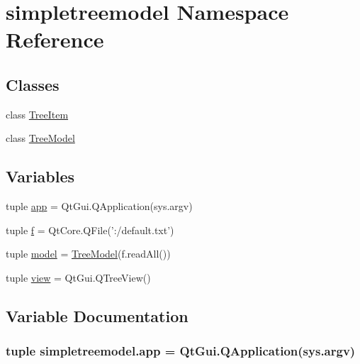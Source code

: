 \hypertarget{namespacesimpletreemodel}{}\section{simpletreemodel Namespace Reference}
\label{namespacesimpletreemodel}
\subsection*{Classes}
\begin{DoxyCompactItemize}
\item 
class \hyperlink{classsimpletreemodel_1_1TreeItem}{Tree\+Item}
\item 
class \hyperlink{classsimpletreemodel_1_1TreeModel}{Tree\+Model}
\end{DoxyCompactItemize}
\subsection*{Variables}
\begin{DoxyCompactItemize}
\item 
tuple \hyperlink{namespacesimpletreemodel_ae4942ea93e20aeb815953d919cacb52b}{app} = Qt\+Gui.\+Q\+Application(sys.\+argv)
\item 
tuple \hyperlink{namespacesimpletreemodel_a3f035ef87a5aa2abb8fbf618a27f931a}{f} = Qt\+Core.\+Q\+File('\+:/default.\+txt')
\item 
tuple \hyperlink{namespacesimpletreemodel_a7819016d83cff061893e791ada1a7537}{model} = \hyperlink{classsimpletreemodel_1_1TreeModel}{Tree\+Model}(f.\+read\+All())
\item 
tuple \hyperlink{namespacesimpletreemodel_a413eefcad78a800c8118faef88c5e481}{view} = Qt\+Gui.\+Q\+Tree\+View()
\end{DoxyCompactItemize}


\subsection{Variable Documentation}
\hypertarget{namespacesimpletreemodel_ae4942ea93e20aeb815953d919cacb52b}{}
\subsubsection[{app}]{\setlength{\rightskip}{0pt plus 5cm}tuple simpletreemodel.\+app = Qt\+Gui.\+Q\+Application(sys.\+argv)}\label{namespacesimpletreemodel_ae4942ea93e20aeb815953d919cacb52b}
\hypertarget{namespacesimpletreemodel_a3f035ef87a5aa2abb8fbf618a27f931a}{}
